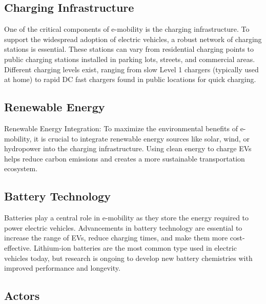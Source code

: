 \subsection{Charging Infrastructure}
\label{ch:Introduction:sec:Electric Mobility:ssec:Charging Infrastructure}


One of the critical components of e-mobility is the charging infrastructure. To support the widespread adoption of electric vehicles, a robust network of charging stations is essential. These stations can vary from residential charging points to public charging stations installed in parking lots, streets, and commercial areas. Different charging levels exist, ranging from slow Level 1 chargers (typically used at home) to rapid DC fast chargers found in public locations for quick charging.

\subsection{Renewable Energy}
\label{ch:Introduction:sec:Electric Mobility:ssec:Renewable Energy}

Renewable Energy Integration: To maximize the environmental benefits of e-mobility, it is crucial to integrate renewable energy sources like solar, wind, or hydropower into the charging infrastructure. Using clean energy to charge EVs helps reduce carbon emissions and creates a more sustainable transportation ecosystem.

\subsection{Battery Technology}
\label{ch:Introduction:sec:Electric Mobility:ssec:Battery Technology}

Batteries play a central role in e-mobility as they store the energy required to power electric vehicles. Advancements in battery technology are essential to increase the range of EVs, reduce charging times, and make them more cost-effective. Lithium-ion batteries are the most common type used in electric vehicles today, but research is ongoing to develop new battery chemistries with improved performance and longevity.



\subsection{Actors}
\label{ch:Introduction:sec:Electric Mobility:ssec:Actors}

